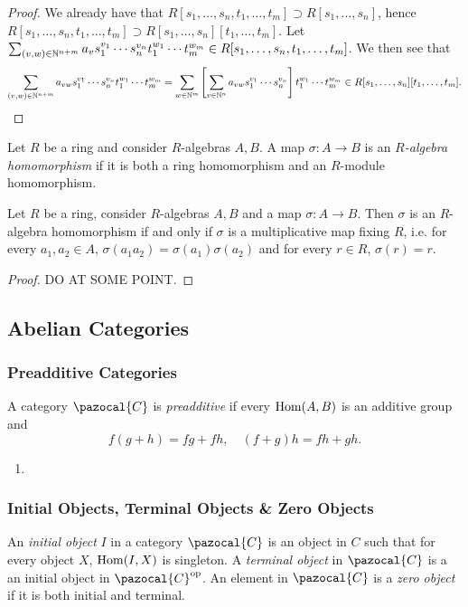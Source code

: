 \begin{proof}
    We already have that $R[s_1,\dots,s_n,t_1,\dots,t_m]\supset R[s_1,\dots,s_n]$, hence $R[s_1,\dots,s_n,t_1,\dots,t_m]\supset R[s_1,\dots,s_n][t_1,\dots,t_m]$. Let $\sum_{(v,w)\in\mathbb{N}^{n+m}} a_vs_1^{v_1}\cdots s_n^{v_n}t_1^{w_1}\cdots t_m^{w_m}\in R[s_1,\dots,s_n,t_1,\dots,t_m]$. We then see that 
    $$\sum_{(v,w)\in\mathbb{N}^{n+m}} a_{vw}s_1^{v_1}\cdots s_n^{v_n}t_1^{w_1}\cdots t_m^{w_m} = \sum_{w\in \mathbb{N}^m}\left[\sum_{v\in \mathbb{N}^n} a_{vw}s_1^{v_1}\cdots s_n^{v_n}\right] t_1^{w_1}\cdots t_m^{w_m}\in R[s_1,\dots,s_n][t_1,\dots,t_m].$$
\end{proof}
\begin{definition}
    Let $R$ be a ring and consider $R$-algebras $A,B$. A map $\sigma : A\rightarrow B$ is an \textit{$R$-algebra homomorphism} if it is both a ring homomorphism and an $R$-module homomorphism.
\end{definition}
\begin{lemma}
    Let $R$ be a ring, consider $R$-algebras $A,B$ and a map $\sigma : A\rightarrow B$. Then $\sigma$ is an $R$-algebra homomorphism if and only if $\sigma$ is a multiplicative map fixing $R$, i.e. for every $a_1,a_2\in A$, $\sigma(a_1a_2)=\sigma(a_1)\sigma(a_2)$ and for every $r\in R$, $\sigma(r) = r$.
\end{lemma}
\begin{proof}
    {\Large DO AT SOME POINT}.
\end{proof}
\subsection{Abelian Categories}
\subsubsection{Preadditive Categories}
\begin{definition}
    A category $\pazocal{C}$ is \textit{preadditive} if every $\mathrm{Hom}(A,B)$ is an additive group and 
    $$f(g+h)=fg+fh, \quad (f+g)h=fh+gh.$$
\end{definition}
\begin{example}
    \begin{enumerate}
        \item 
    \end{enumerate}
\end{example}
\subsubsection{Initial Objects, Terminal Objects \& Zero Objects}
\begin{definition}
    An \textit{initial object} $I$ in a category $\pazocal{C}$ is an object in $C$ such that for every object $X$, $\mathrm{Hom}(I,X)$ is singleton. A \textit{terminal object} in $\pazocal{C}$ is a an initial object in $\pazocal{C}\op$. An element in $\pazocal{C}$ is a \textit{zero object} if it is both initial and terminal. 
\end{definition}
